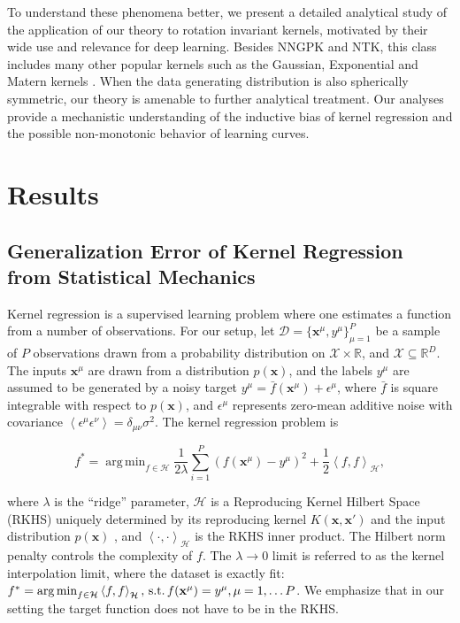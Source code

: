 \documentclass[11pt]{article}
\DeclareMathOperator*{\argmin}{arg\,min}
\def\x{{\mathbf x}}
\begin{document}
To understand these phenomena better, we present a detailed analytical study of the application of our theory to rotation invariant kernels, motivated by their wide use and relevance for deep learning. Besides NNGPK and NTK, this class includes many other popular kernels such as the Gaussian, Exponential and Matern kernels \cite{genton2001classes,RasmussenWilliams}. When the data generating distribution is also spherically symmetric, our theory is amenable to further analytical treatment. Our analyses provide a mechanistic understanding of the inductive bias of kernel regression and the possible non-monotonic behavior of learning curves.

\section*{Results}
\subsection*{Generalization Error of Kernel Regression from Statistical Mechanics}

Kernel regression is a supervised learning problem where one estimates a function from a number of observations. For our setup, let $\mathcal{D} = \{\mathbf{x}^\mu, y^\mu\}_{\mu=1}^P$ be a sample of $P$ observations drawn from a probability distribution on $\mathcal{X} \times \mathbb{R}$, and $\mathcal X \subseteq \mathbb{R}^D$. The inputs $\x^{\mu}$ are drawn from a distribution $p(\x)$, and the labels $y^\mu$ are assumed to be generated by a noisy target $ y^\mu = \bar f(\mathbf{x}^\mu) + \epsilon^\mu$, where $\bar f$ is square integrable with respect to $p(\x)$, and $\epsilon^\mu$ represents zero-mean additive noise with covariance $\left< \epsilon^\mu \epsilon^\nu \right> = \delta_{\mu \nu} \sigma^2$. The kernel regression problem is
\begin{linenomath*}\begin{equation}\label{eq:regression}
    f^* = \argmin_{f \in \mathcal{H}} \frac{1}{2\lambda } \sum_{i=1}^P ( f(\mathbf{x}^\mu) - y^\mu)^2 + \frac{1}{2}\left< f,f \right>_{\mathcal{H}},
\end{equation}\end{linenomath*}
where $\lambda$ is the ``ridge'' parameter, $\mathcal{H}$ is a Reproducing Kernel Hilbert Space (RKHS) uniquely determined by its reproducing kernel $K(\mathbf{x},\mathbf{x}')$ and the input distribution $p(\x)$ \cite{scholkopf2002learning},  and  $\left< \cdot, \cdot \right>_{\mathcal{H}}$ is the RKHS inner product. The Hilbert norm penalty controls the complexity of $f$. The $\lambda\to 0$ limit is referred to as the kernel interpolation limit, where the dataset is exactly fit: $f^* = \argmin_{f \in \mathcal{H}} \left< f,f \right>_{\mathcal{H}},\,{\rm s.t.}\, f(\mathbf{x}^\mu) = y^\mu, \mu = 1,\ldots P$. We emphasize that in our setting the target function does not have to be in the RKHS. 
\end{document}
